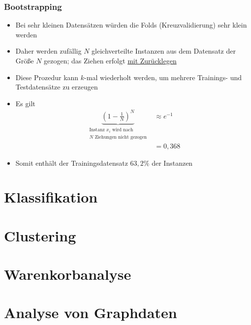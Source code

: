 \documentclass{scrartcl}
\begin{document}
\subsubsection{Bootstrapping}

\begin{itemize}
	\item Bei sehr kleinen Datensätzen würden die Folds (Kreuzvalidierung) sehr 
	klein werden
	\item Daher werden zufällig $ N $ gleichverteilte Instanzen aus dem 
	Datensatz der Größe $ N $ gezogen; das Ziehen erfolgt \underline{mit 
	Zurücklegen}
	\item Diese Prozedur kann $ k $-mal wiederholt werden, um mehrere 
	Trainings- und Testdatensätze zu erzeugen
	\item Es gilt
	\begin{align*}
		\underbrace{(1 - \frac{1}{N})^N}_{\substack{\text{Instanz } x_i \text{ 
		wird nach } \\ N \text{ Ziehungen nicht gezogen}}} &\approx e^{-1} \\
		&= 0,368
	\end{align*}
	\item Somit enthält der Trainingsdatensatz $ 63,2\% $ der Instanzen
\end{itemize}

\section{Klassifikation}

\section{Clustering}

\section{Warenkorbanalyse}

\section{Analyse von Graphdaten}
\end{document}
